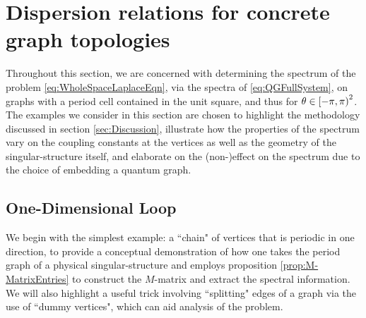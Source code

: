 
\section{Dispersion relations for concrete graph topologies} \label{sec:Examples}
Throughout this section, we are concerned with determining the spectrum of the problem \eqref{eq:WholeSpaceLaplaceEqn}, via the spectra of \eqref{eq:QGFullSystem}, on graphs with a period cell contained in the unit square, and thus for $\theta\in\left[-\pi,\pi\right)^2$.
The examples we consider in this section are chosen to highlight the methodology discussed in section \ref{sec:Discussion}, illustrate how the properties of the spectrum vary on the coupling constants at the vertices as well as the geometry of the singular-structure itself, and elaborate on the (non-)effect on the spectrum due to the choice of embedding a quantum graph. 

\subsection{One-Dimensional Loop} \label{ssec:Example1DLoop}
We begin with the simplest example: a ``chain" of vertices that is periodic in one direction, to provide a conceptual demonstration of how one takes the period graph of a physical singular-structure and employs proposition \ref{prop:M-MatrixEntries} to construct the $M$-matrix and extract the spectral information.
We will also highlight a useful trick involving ``splitting" edges of a graph via the use of ``dummy vertices", which can aid analysis of the problem.

